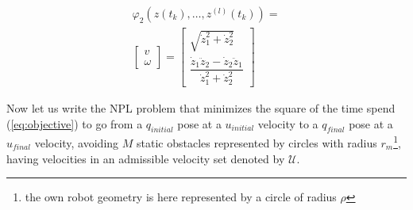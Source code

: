 \begin{equation}\label{eq:phi2}
\begin{array}{l}
            \varphi_2(z(t_k),\dotsc,z^{(l)}(t_k))=\\
            \left[\begin{array}{c}
            v\\
            \omega
            \end{array}\right]
            = \left[\begin{array}{c}
            \sqrt{\dot{z}_{1}^{2} + \dot{z}_{2}^{2}}\\
            \dfrac{\dot{z}_{1}\ddot{z}_{2} -
            \dot{z}_{2}\ddot{z}_{1}}{\dot{z}_{1}^{2}+\dot{z}_{2}^{2}}
            \end{array}\right]
            \end{array}
\end{equation}


Now let us write the NPL problem that minimizes the square of the time spend (\ref{eq:objective}) to go from a $q_{initial}$ pose at a $u_{initial}$ velocity to a $q_{final}$ pose at a $u_{final}$ velocity, avoiding $M$ static obstacles represented by circles with radius $r_m$\footnote{the own robot geometry is here represented by a circle of radius $\rho$}, having velocities in an admissible velocity set denoted by $\mathcal{U}$.

